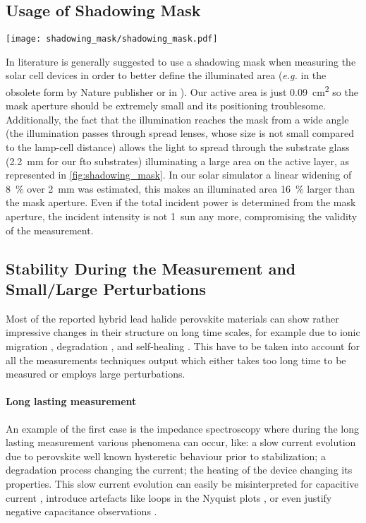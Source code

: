 	\subsection{Usage of Shadowing Mask}

		\begin{SCfigure}
			\centering
			\texttt{[image: shadowing\_mask/shadowing\_mask.pdf]}
			\label{fig:shadowing_mask}
		\end{SCfigure}

		In literature is generally suggested to use a shadowing mask when measuring the solar cell devices in order to better define the illuminated area (\textsl{e.g.} in the obsolete \cite{Brinser2017} form by Nature publisher \cite{NatureResearch2017} or in \cite{Christians2015}).
		Our active area is just \SI{0.09}{\square\cm} so the mask aperture should be extremely small and its positioning troublesome.
		Additionally, the fact that the illumination reaches the mask from a wide angle (the illumination passes through spread lenses, whose size is not small compared to the lamp-cell distance) allows the light to spread through the substrate glass (\SI{2.2}{\mm} for our \gls{fto} substrates) illuminating a large area on the active layer, as represented in \cref{fig:shadowing_mask}.
		In our solar simulator a linear widening of 8~\% over \SI{2}{\mm} was estimated, this makes an illuminated area 16~\% larger than the mask aperture.
		Even if the total incident power is determined from the mask aperture, the incident intensity is not 1~sun any more, compromising the validity of the measurement.


	\subsection{Stability During the Measurement and Small\-/Large Perturbations}

		Most of the reported hybrid lead halide perovskite materials can show rather impressive changes in their structure on long time scales, for example due to ionic migration \cite{Calado2016}, degradation \cite{OKane2019}, and self-healing \cite{Ceratti2018}.
		This have to be taken into account for all the measurements techniques output which either takes too long time to be measured or employs large perturbations.

		\paragraph{Long lasting measurement}
		An example of the first case is the impedance spectroscopy where during the long lasting measurement various phenomena can occur, like: a slow current evolution due to perovskite well known hysteretic behaviour prior to stabilization; a degradation process changing the current; the heating of the device changing its properties.
		This slow current evolution can easily be misinterpreted for capacitive current \cite{Jacobs2018}, introduce artefacts like loops in the Nyquist plots \cite{Moia2019}, or even justify negative capacitance observations \cite{Knapp2015}.

